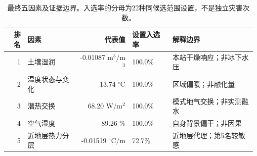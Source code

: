 \begin{table}[H]\centering\scriptsize
\caption{最终五因素及证据边界。入选率的分母为22种同候选范围设置，不是独立灾害次数。}
\label{tab:q1:top5}
\begin{tabularx}{\linewidth}{rlrlX}\toprule 排名 & 因素 & 代表值 & 设置入选率 & 解释边界\\\midrule
1 & 土壤湿润 & -0.01087 m$^3$/m$^3$ & 100.0\% & 本站干燥响应；非冰下水压 \\
2 & 温度状态与变化 & 13.74 $^\circ$C & 100.0\% & 区域偏暖；非融化量 \\
3 & 潜热交换 & 68.20 W/m$^2$ & 100.0\% & 模式地气交换；非实测融水 \\
4 & 空气湿度 & 89.26 \% & 100.0\% & 自身背景偏干；非因果 \\
5 & 近地层热力分层 & -0.01519 $^\circ$C/m & 72.7\% & 近地层代理；第5名较敏感 \\
\bottomrule\end{tabularx}\end{table}
